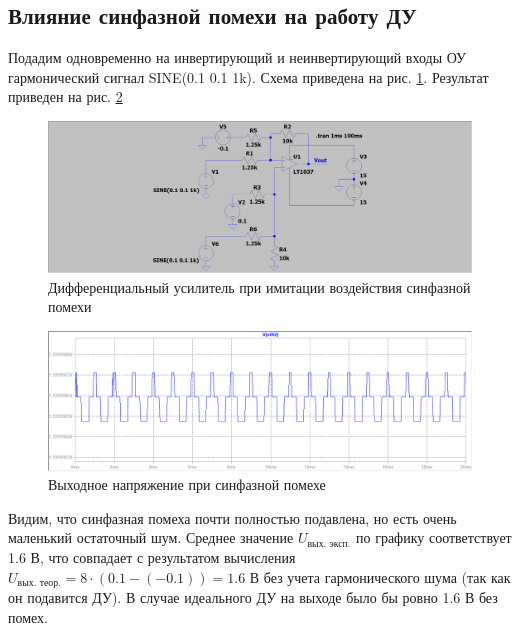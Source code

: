 \documentclass[a4paper, 12pt]{article}
\begin{document}
    \subsection{Влияние синфазной помехи на работу ДУ}
    Подадим одновременно на инвертирующий и неинвертирующий входы ОУ гармонический сигнал SINE(0.1 0.1 1k).
    Схема приведена на рис. \ref{fig:scheme2}.
    Результат приведен на рис. \ref{fig:1task_sine2}
    \begin{figure}[H]
        \centering
        \includegraphics[scale=0.22]{scheme2.png}
        \captionsetup{skip=0pt}
        \caption{Дифференциальный усилитель при имитации воздействия синфазной помехи}
        \label{fig:scheme2}
    \end{figure}
    \begin{figure}[H]
        \centering
        \includegraphics[scale=0.46]{1task_sine2.png}
        \captionsetup{skip=0pt}
        \caption{Выходное напряжение при синфазной помехе}
        \label{fig:1task_sine2}
    \end{figure}
    \noindent Видим, что синфазная помеха почти полностью подавлена, но есть очень маленький остаточный шум.
    Среднее значение $U_{\text{вых. эксп.}}$ по графику соответствует 1.6 В, что совпадает с результатом вычисления
    $U_{\text{вых. теор.}}=8\cdot\left( 0.1-\left( -0.1 \right) \right)=1.6$ В без учета гармонического шума (так как он подавится ДУ).
    В случае идеального ДУ на выходе было бы ровно 1.6 В без помех.
\end{document}
